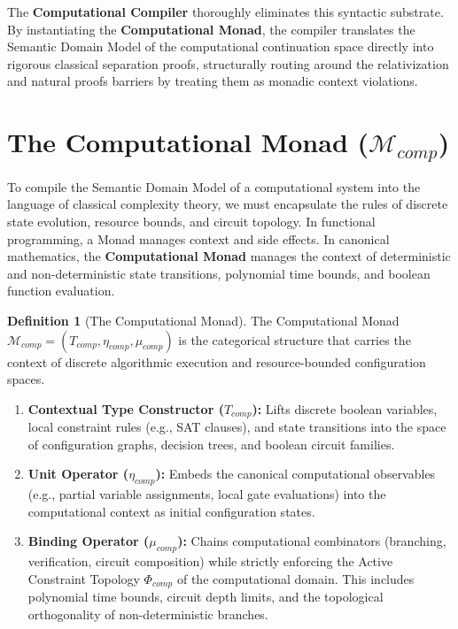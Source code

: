 \documentclass[12pt,openany]{extbook}
\theoremstyle{plain}
\theoremstyle{definition}
\newtheorem{definition}{Definition}[chapter]
\begin{document}
The \textbf{Computational Compiler} thoroughly eliminates this syntactic substrate. By instantiating the \textbf{Computational Monad}, the compiler translates the Semantic Domain Model of the computational continuation space directly into rigorous classical separation proofs, structurally routing around the relativization and natural proofs barriers by treating them as monadic context violations.

\section{The Computational Monad ($\mathcal{M}_{comp}$)}

To compile the Semantic Domain Model of a computational system into the language of classical complexity theory, we must encapsulate the rules of discrete state evolution, resource bounds, and circuit topology. In functional programming, a Monad manages context and side effects. In canonical mathematics, the \textbf{Computational Monad} manages the context of deterministic and non-deterministic state transitions, polynomial time bounds, and boolean function evaluation.

\begin{definition}[The Computational Monad]
The Computational Monad $\mathcal{M}_{comp} = (T_{comp}, \eta_{comp}, \mu_{comp})$ is the categorical structure that carries the context of discrete algorithmic execution and resource-bounded configuration spaces.
\begin{enumerate}
    \item \textbf{Contextual Type Constructor ($T_{comp}$):} Lifts discrete boolean variables, local constraint rules (e.g., SAT clauses), and state transitions into the space of configuration graphs, decision trees, and boolean circuit families.
    \item \textbf{Unit Operator ($\eta_{comp}$):} Embeds the canonical computational observables (e.g., partial variable assignments, local gate evaluations) into the computational context as initial configuration states.
    \item \textbf{Binding Operator ($\mu_{comp}$):} Chains computational combinators (branching, verification, circuit composition) while strictly enforcing the Active Constraint Topology $\Phi_{comp}$ of the computational domain. This includes polynomial time bounds, circuit depth limits, and the topological orthogonality of non-deterministic branches.
\end{enumerate}
\end{definition}
\end{document}
